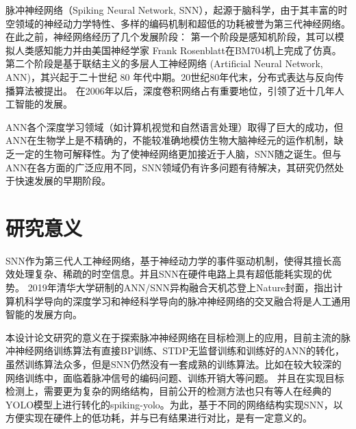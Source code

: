 \par
脉冲神经网络（Spiking Neural Network, SNN），起源于脑科学，由于其丰富的时空领域的神经动力学特性、多样的编码机制和超低的功耗被誉为第三代神经网络。在此之前，神经网络经历了几个发展阶段：
第一个阶段是感知机阶段，其可以模拟人类感知能力并由美国神经学家 Frank Rosenblatt在BM704机上完成了仿真。
第二个阶段是基于联结主义的多层人工神经网络 (Artificial Neural Network, ANN)，其兴起于二十世纪 80 年代中期。20世纪80年代末，分布式表达与反向传播算法被提出。
在2006年以后，深度卷积网络占有重要地位，引领了近十几年人工智能的发展。
\par
ANN各个深度学习领域（如计算机视觉和自然语言处理）取得了巨大的成功，但ANN在生物学上是不精确的，不能较准确地模仿生物大脑神经元的运作机制，缺乏一定的生物可解释性。为了使神经网络更加接近于人脑，SNN随之诞生。但与ANN在各方面的广泛应用不同，SNN领域仍有许多问题有待解决，其研究仍然处于快速发展的早期阶段。
\section{研究意义}
\par
SNN作为第三代人工神经网络，基于神经动力学的事件驱动机制，使得其擅长高效处理复杂、稀疏的时空信息。并且SNN在硬件电路上具有超低能耗实现的优势。
2019年清华大学研制的ANN/SNN异构融合天机芯登上Nature封面，指出计算机科学导向的深度学习和神经科学导向的脉冲神经网络的交叉融合将是人工通用智能的发展方向。
\par
本设计论文研究的意义在于探索脉冲神经网络在目标检测上的应用，目前主流的脉冲神经网络训练算法有直接BP训练、STDP无监督训练和训练好的ANN的转化，
虽然训练算法众多，但是SNN仍然没有一套成熟的训练算法。比如在较大较深的网络训练中，面临着脉冲信号的编码问题、训练开销大等问题。
并且在实现目标检测上，需要更为复杂的网络结构，目前公开的检测方法也只有等人在经典的YOLO模型上进行转化的spiking-yolo。为此，基于不同的网络结构实现SNN，以方便实现在硬件上的低功耗，并与已有结果进行对比，是有一定意义的。
